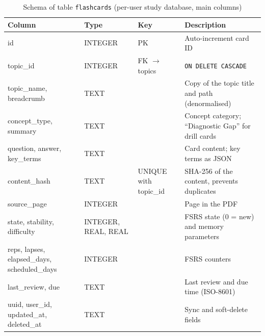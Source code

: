 \begin{table}[htbp]
\centering\small
\caption{Schema of table \texttt{flashcards} (per-user study database, main columns)}\label{tab:schema_legacy_flashcards}
\begin{tabularx}{\textwidth}{@{}>{\raggedright\arraybackslash}p{} >{\raggedright\arraybackslash}p{} >{\raggedright\arraybackslash}p{} >{\raggedright\arraybackslash}X@{}}
\toprule
\textbf{Column} & \textbf{Type} & \textbf{Key} & \textbf{Description}\\
\midrule
id & INTEGER & PK & Auto-increment card ID\\
topic\_id & INTEGER & FK $\rightarrow$ topics & \texttt{ON DELETE CASCADE}\\
topic\_name, breadcrumb & TEXT & & Copy of the topic title and path (denormalised)\\
concept\_type, summary & TEXT & & Concept category; ``Diagnostic Gap'' for drill cards\\
question, answer, key\_terms & TEXT & & Card content; key terms as JSON\\
content\_hash & TEXT & UNIQUE with topic\_id & SHA-256 of the content, prevents duplicates\\
source\_page & INTEGER & & Page in the PDF\\
state, stability, difficulty & INTEGER, REAL, REAL & & FSRS state (0 = new) and memory parameters\\
reps, lapses, elapsed\_days, scheduled\_days & INTEGER & & FSRS counters\\
last\_review, due & TEXT & & Last review and due time (ISO-8601)\\
uuid, user\_id, updated\_at, deleted\_at & TEXT & & Sync and soft-delete fields\\
\bottomrule
\end{tabularx}
\end{table}

